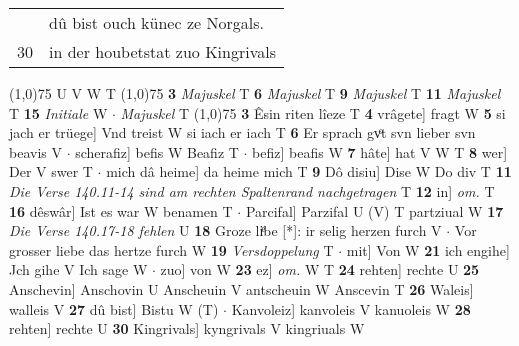 \documentclass[8pt,a4paper,notitlepage]{article}
\begin{document}
\begin{table}[ht]
\begin{minipage}[t]{0.5\linewidth}
\begin{tabular}{rl}
 & dû bist ouch künec ze Norgals.\\ 
30 & in der houbetstat zuo Kingrivals\\ 
\end{tabular}
\scriptsize
\line(1,0){75} \newline
U V W T \newline
\line(1,0){75} \newline
\textbf{3} \textit{Majuskel} T  \textbf{6} \textit{Majuskel} T  \textbf{9} \textit{Majuskel} T  \textbf{11} \textit{Majuskel} T  \textbf{15} \textit{Initiale} W   $\cdot$ \textit{Majuskel} T  \newline
\line(1,0){75} \newline
\textbf{3} Êsin riten lîeze T \textbf{4} vrâgete] fragt W \textbf{5} si jach er trüege] Vnd treist W si iach er iach T \textbf{6} Er sprach gvͦt svn lieber svn beavis V  $\cdot$ scherafiz] befis W Beafiz T  $\cdot$ befiz] beafis W \textbf{7} hâte] hat V W T \textbf{8} wer] Der V swer T  $\cdot$ mich dâ heime] da heime mich T \textbf{9} Dô disiu] Dise W Do div T \textbf{11} \textit{Die Verse 140.11-14 sind am rechten Spaltenrand nachgetragen} T  \textbf{12} in] \textit{om.} T \textbf{16} dêswâr] Ist es war W benamen T  $\cdot$ Parcifal] Parzifal U (V) T partziual W \textbf{17} \textit{Die Verse 140.17-18 fehlen} U  \textbf{18} Groze liͤbe [*]: ir selig herzen furch V  $\cdot$ Vor grosser liebe das hertze furch W \textbf{19} \textit{Versdoppelung} T   $\cdot$ mit] Von W \textbf{21} ich engihe] Jch gihe V Ich sage W  $\cdot$ zuo] von W \textbf{23} ez] \textit{om.} W T \textbf{24} rehten] rechte U \textbf{25} Anschevin] Anschovin U Anscheuin V antscheuin W Anscevin T \textbf{26} Waleis] walleis V \textbf{27} dû bist] Bistu W (T)  $\cdot$ Kanvoleiz] kanvoleis V kanuoleis W \textbf{28} rehten] rechte U \textbf{30} Kingrivals] kyngrivals V kingriuals W \newline
\end{minipage}
\end{table}
\end{document}
